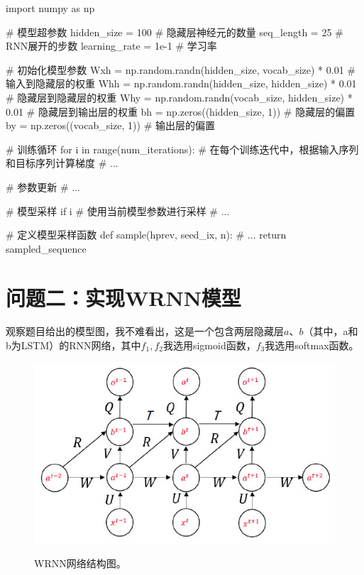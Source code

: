 \documentclass[letterpaper,12pt]{article}
\begin{document}
		\begin{python}
			import numpy as np
			
			# 模型超参数
			hidden_size = 100  # 隐藏层神经元的数量
			seq_length = 25  # RNN展开的步数
			learning_rate = 1e-1  # 学习率
			
			# 初始化模型参数
			Wxh = np.random.randn(hidden_size, vocab_size) * 0.01  # 输入到隐藏层的权重
			Whh = np.random.randn(hidden_size, hidden_size) * 0.01  # 隐藏层到隐藏层的权重
			Why = np.random.randn(vocab_size, hidden_size) * 0.01  # 隐藏层到输出层的权重
			bh = np.zeros((hidden_size, 1))  # 隐藏层的偏置
			by = np.zeros((vocab_size, 1))  # 输出层的偏置
			
			# 训练循环
			for i in range(num_iterations):
				# 在每个训练迭代中，根据输入序列和目标序列计算梯度
				# ...
				
				# 参数更新
				# ...
				
				# 模型采样
				if i %
				# 使用当前模型参数进行采样
				# ...
			
			# 定义模型采样函数
			def sample(hprev, seed_ix, n):
				# ...
				return sampled_sequence
			
		\end{python}
	
			
	
	\section{问题二：实现WRNN模型}
	
	观察题目给出的模型图，我不难看出，这是一个包含两层隐藏层$a$、$b$（其中，a和b为LSTM）的RNN网络，其中$f_1,f_2$我选用sigmoid函数，$f_3$我选用softmax函数。
	
	\begin{figure}[htbp] 
		\centering 
		\includegraphics[width=0.5\linewidth]{network}
		\captionsetup{font=scriptsize}
		\label{network}
		\captionsetup{font=scriptsize}
		\caption{
			\label{fig: WRNN_network} %
			WRNN网络结构图。
		}
	\end{figure}
	
\end{document}
